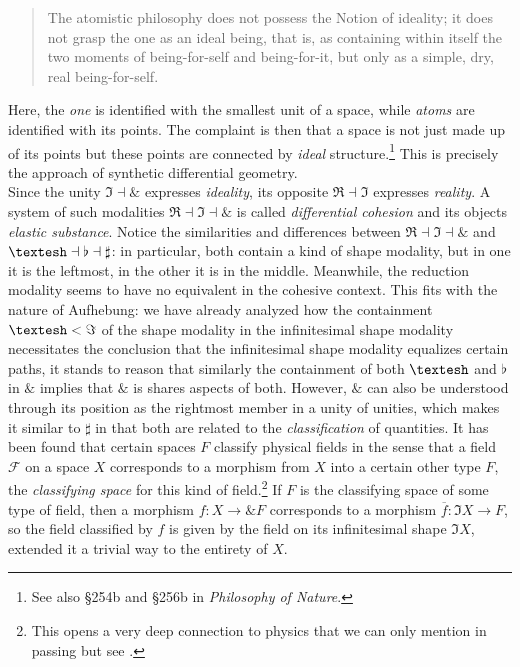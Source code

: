 \documentclass{article}
\begin{document}
\begin{quote}
    The atomistic philosophy does not possess the Notion of ideality; it does not grasp the one as an ideal being, that is, as containing within itself the two moments of being-for-self and being-for-it, but only as a simple, dry, real being-for-self.
\end{quote}

Here, the \emph{one} is identified with the smallest unit of a space, while \emph{atoms} are identified with
its points. The complaint is then that a space is not just made up of its points but these points
are connected by \emph{ideal} structure.\footnote{See also §254b and §256b in \emph{Philosophy of Nature}.}
This is precisely the approach of synthetic differential geometry. \\

Since the unity $\Im\dashv\&$ expresses \emph{ideality}, its opposite $\Re\dashv\Im$ expresses
\emph{reality}. A system of such modalities $\Re\dashv\Im\dashv\&$ is called \emph{differential cohesion} and
its objects \emph{elastic substance}. Notice the similarities and differences between $\Re\dashv\Im\dashv\&$
and $\textrm{\textesh}\dashv\flat\dashv\sharp$: in particular, both contain a kind of shape modality, but in
one it is the leftmost, in the other it is in the middle. Meanwhile, the reduction modality seems to have no
equivalent in the cohesive context. This fits with the nature of Aufhebung: we have already analyzed how the
containment $\textrm{\textesh}<\Im$ of the shape modality in the infinitesimal shape modality necessitates
the conclusion that the infinitesimal shape modality equalizes certain paths, it stands to reason that
similarly the containment of both $\textrm{\textesh}$ and $\flat$ in $\&$ implies that $\&$ is shares aspects
of both. However, $\&$ can also be understood through its position as the rightmost member in a unity of
unities, which makes it similar to $\sharp$ in that both are related to the \emph{classification} of
quantities. It has been found that certain spaces $F$ classify physical fields in the sense that a field
$\mathcal{F}$ on a space $X$ corresponds to a morphism from $X$ into a certain other type $F$, the
\emph{classifying space} for this kind of field.\footnote{This opens a very deep connection to physics that we
can only mention in passing but see \cite{dcct}.} If $F$ is the classifying space of some type of field,
then a morphism $f:X\rightarrow \& F$ corresponds to a morphism $\overline{f}:\Im X\rightarrow F$, so the
field classified by $f$ is given by the field on its infinitesimal shape $\Im X$, extended it a trivial way
to the entirety of $X$.   \\
\end{document}

